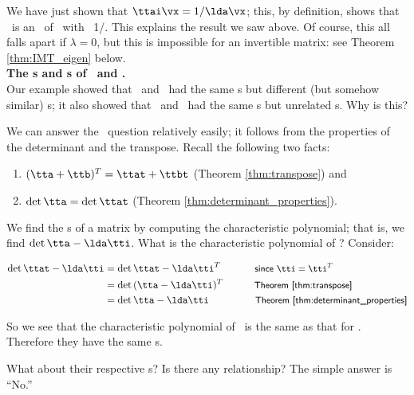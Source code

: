 We have just shown that $\ttai\vx = 1/\lda\vx$; this, by definition, shows that \vx\ is an \ev\ of \ttai\ with \el\ 1/\lda. This explains the result we saw above. Of course, this all falls apart if $\lambda = 0$, but this is impossible for an invertible matrix: see Theorem \ref{thm:IMT_eigen} below.\\

\noindent \textsf{\textbf{The \el s and \ev s of \tta\ and \ttat.}}\\

Our example showed that \tta\ and \ttat\ had the same \el s but different (but somehow similar) \ev s; it also showed that \ttb\ and \ttbt\ had the same \el s but unrelated \ev s. Why is this?

We can answer the \el\ question relatively easily; it follows from the properties of the determinant and the transpose. Recall the following two facts:
	\begin{enumerate}
	\item		$(\tta +\ttb)^T = \ttat + \ttbt$ (Theorem \ref{thm:transpose}) and 
	\item		$\det{\tta} = \det{\ttat}$ (Theorem \ref{thm:determinant_properties}).
	\end{enumerate}
	
We find the \el s of a matrix by computing the characteristic polynomial; that is, we find $\det{\tta - \lda\tti}$. What is the characteristic polynomial of \ttat? Consider:

\begin{align*}
\det{\ttat - \lda\tti} & = \det{\ttat - \lda\tti^T} \textsf{\hskip 34 pt \small since $\tti = \tti^T$} \\
 & = \det{(\tta - \lda\tti)^T}  \textsf{\hskip 31 pt\small Theorem \ref{thm:transpose}} \\
 & = \det{\tta-\lda\tti}   \textsf{\hskip 46 pt \small Theorem \ref{thm:determinant_properties}}\\
\end{align*} 

So we see that the characteristic polynomial of \ttat\ is the same as that for \tta. Therefore they have the same \el s. 

What about their respective \ev s? Is there any relationship? The simple answer is ``No.''


